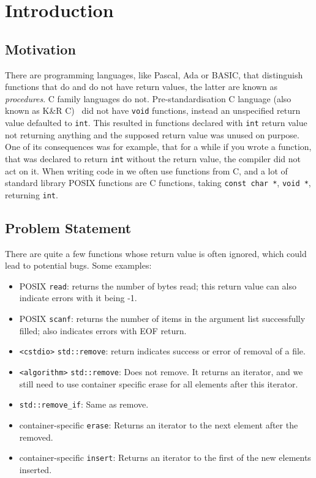 \chapter{Introduction}
\label{ch:intro}

\section{Motivation}

There are programming languages, like Pascal, Ada or BASIC, that distinguish functions that do and do not
have return values,
the latter are known as \emph{procedures}. C family languages do not. Pre-standardisation C language (also known as K\&R C)~\cite{kandr}
did not have \lstinline{void} functions,
instead an unspecified return value defaulted to \lstinline{int}. This resulted in functions declared with \lstinline{int} return value
not returning anything and the supposed return value was unused on purpose. One of its consequences was for example, that for a while if
you wrote a function, that was declared to return \lstinline{int} without the return value, the compiler did not act on it. When writing
code in \CC{} we often use functions from C, and a lot of standard library POSIX functions are C functions, taking \lstinline{const char *},
\lstinline{void *}, returning \lstinline{int}.

\section{Problem Statement}
\label{sec:prob-state}

There are quite a few functions whose return value is often ignored, which could lead to potential bugs. Some examples:

\begin{itemize}
	\item POSIX \texttt{read}: returns the number of bytes read; this return value can also indicate errors with it being -1.
	\item POSIX \texttt{scanf}: returns the number of items in the argument list successfully filled; also indicates errors with EOF return.
	\item \texttt{<cstdio>} \texttt{std::remove}: return indicates success or error of removal of a file.
    \item \texttt{<algorithm>} \texttt{std::remove}: Does not remove. It returns an iterator, and we still need to use container specific erase
    for all elements after this iterator.
	\item \texttt{std::remove\_if}: Same as remove.
	\item container-specific \texttt{erase}: Returns an iterator to the next element after the removed. 
	\item container-specific \texttt{insert}: Returns an iterator to the first of the new elements inserted.
\end{itemize}

